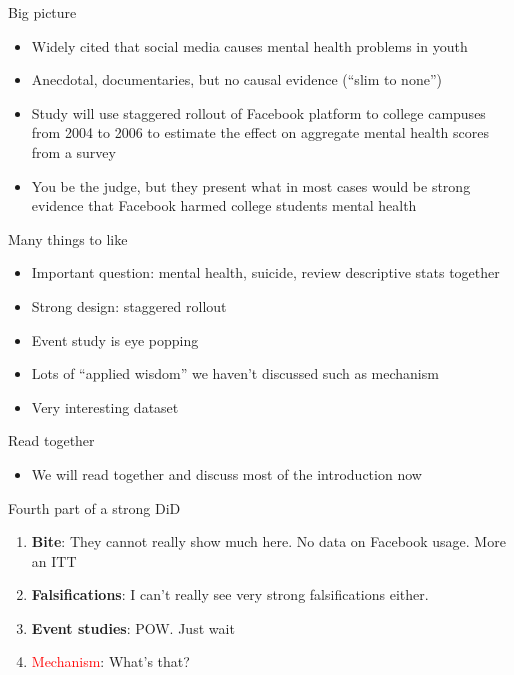 \documentclass{beamer}
\begin{document}
\begin{frame}{Big picture}

\begin{itemize}
\item Widely cited that social media causes mental health problems in youth
\item Anecdotal, documentaries, but no causal evidence (``slim to none'')
\item Study will use staggered rollout of Facebook platform to college campuses from 2004 to 2006 to estimate the effect on aggregate mental health scores from a survey
\item You be the judge, but they present what in most cases would be strong evidence that Facebook harmed college students mental health

\end{itemize}

\end{frame}

\begin{frame}{Many things to like}

\begin{itemize}
\item Important question: mental health, suicide, review descriptive stats together
\item Strong design: staggered rollout
\item Event study is eye popping
\item Lots of ``applied wisdom'' we haven't discussed such as mechanism
\item Very interesting dataset

\end{itemize}

\end{frame}

\begin{frame}{Read together}

\begin{itemize}

\item We will read together and discuss most of the introduction now

\end{itemize}

\end{frame}

\begin{frame}{Fourth part of a strong DiD}

\begin{enumerate}

\item \textbf{Bite}: They cannot really show much here.  No data on Facebook usage.  More an ITT
\item \textbf{Falsifications}: I can't really see very strong falsifications either.
\item \textbf{Event studies}: POW.  Just wait
\item \textcolor{red}{Mechanism}: What's that?

\end{enumerate}

\end{frame}
\end{document}
